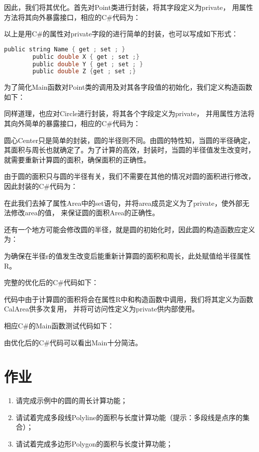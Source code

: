 因此，我们将其优化。首先对Point类进行封装，将其字段定义为private，
用属性方法将其向外暴露接口，相应的C\#代码为：



以上是用C\#的属性对private字段的进行简单的封装，也可以写成如下形式：
\begin{lstlisting}[language=C]
        public string Name { get ; set ; }
        public double X { get ; set ;}
        public double Y { get ; set ; }
        public double Z {get ; set ;}
\end{lstlisting}

为了简化Main函数对Point类的调用及对其各字段值的初始化，我们定义构造函数如下：


同样道理，也应对Circle进行封装，将其各个字段定义为private，
并用属性方法将其向外简单的暴露接口，相应的C\#代码为：



圆心Center只是简单的封装，圆的半径则不同。由圆的特性知，当圆的半径确定，
其面积与周长也就确定了。为了计算的高效，封装时，当圆的半径值发生改变时，
就需要重新计算圆的面积，确保面积的正确性。

由于圆的面积只与圆的半径有关，我们不需要在其他的情况对圆的面积进行修改，
因此封装的C\#代码为：



在此我们去掉了属性Area中的set语句，并将area成员定义为了private，使外部无法修改area的值，
来保证圆的面积Area的正确性。

还有一个地方可能会修改圆的半径，就是圆的初始化时，因此圆的构造函数应定义为：



为确保在半径r的值发生改变后能重新计算圆的面积和周长，此处赋值给半径属性R。

完整的优化后的C\#代码如下：


代码中由于计算圆的面积将会在属性R中和构造函数中调用，我们将其定义为函数CalArea供多次复用，
并将可访问性定义为private供内部使用。

相应C\#的Main函数测试代码如下：



由优化后的C\#代码可以看出Main十分简洁。

\section{作业}
\begin{enumerate}
\item 请完成示例中的圆的周长计算功能；
\item 请试着完成多段线Polyline的面积与长度计算功能（提示：多段线是点序的集合）；
\item 请试着完成多边形Polygon的面积与长度计算功能；
\end{enumerate}
